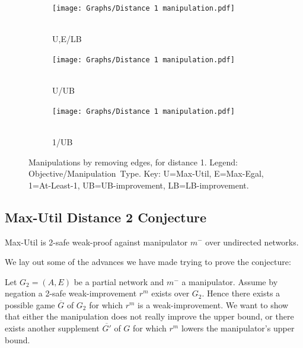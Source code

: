 \begin{figure}
    \centering
    \begin{subfigure}{0.07\textwidth}
        \centering
        \texttt{[image: Graphs/Distance 1 manipulation.pdf]}
        \caption{\\U,E/LB}
        \label{fig:distance1_util/egal_lb}
    \end{subfigure} \hspace{20pt}
    \begin{subfigure}{0.07\textwidth}
        \centering
        \texttt{[image: Graphs/Distance 1 manipulation.pdf]}
        \caption{\\U/UB}
        \label{fig:distance1_util_ub}
    \end{subfigure} \hspace{20pt}
    \begin{subfigure}{0.07\textwidth}
        \centering
        \texttt{[image: Graphs/Distance 1 manipulation.pdf]}
        \caption{\\1/UB}
        \label{fig:distance1_least1}
    \end{subfigure}
    \caption{Manipulations by removing edges, for distance 1. Legend: Objective/Manipulation~Type. Key: U=Max-Util, E=Max-Egal, 1=At-Least-1, UB=UB-improvement, LB=LB-improvement.}
    \label{fig:distance1_manipulation}
\end{figure}


\clearpage

\subsection*{Max-Util Distance 2 Conjecture}
\begin{conjecture}
\label{conj:util}
Max-Util is 2-safe weak-proof against manipulator $m^-$ over undirected networks.
\end{conjecture}

We lay out some of the advances we have made trying to prove the conjecture:

Let $G_2=(A,E)$ be a partial network and $m^-$ a manipulator. Assume by negation a 2-safe weak-improvement $r^m$ exists over $G_2$. Hence there exists a possible game $\overline{G}$ of $G_2$ for which $r^m$ is a weak-improvement. We want to show that either the manipulation does not really improve the upper bound, or there exists another supplement $\overline{G'}$ of $G$ for which $r^m$ lowers the manipulator's upper bound.


